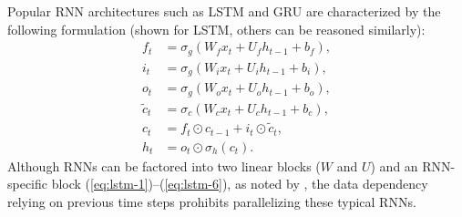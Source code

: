 \documentclass[11pt]{article}
\begin{document}
Popular RNN architectures such as LSTM \cite{RNN_LSTM97} and GRU \cite{RNN_GRU2014} are characterized by the following formulation (shown for LSTM, others can be reasoned similarly):
\begin{align}
f_t &= \sigma_g(W_{f} x_t + U_{f} h_{t-1} + b_f), \label{eq:lstm-1}\\
i_t &= \sigma_g(W_{i} x_t + U_{i} h_{t-1} + b_i), \\
o_t &= \sigma_g(W_{o} x_t + U_{o} h_{t-1} + b_o), \\
\tilde{c}_t &= \sigma_c(W_{c} x_t + U_{c} h_{t-1} + b_c), \\
c_t &= f_t \odot c_{t-1} + i_t \odot \tilde{c}_t,\\
h_t &= o_t \odot \sigma_h(c_t). \label{eq:lstm-6}
\end{align}
Although RNNs can be factored into two linear blocks ($W$ and $U$) and an RNN-specific block (\ref{eq:lstm-1})--(\ref{eq:lstm-6}), as noted by \citet{RNN_QuasiRNN17},
the data dependency relying on previous time steps prohibits parallelizing these typical RNNs.
\end{document}
